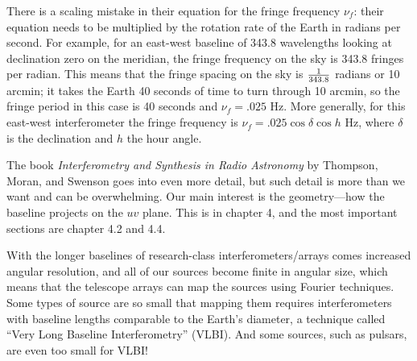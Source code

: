 \documentclass[11pt,preprint]{aastex}
\begin{document}
	There is a scaling mistake in their equation for the fringe
frequency $\nu_f$: their equation needs to be multiplied by the rotation
rate of the Earth in radians per second.  For example, for an east-west
baseline of 343.8 wavelengths looking at declination zero on the
meridian, the fringe frequency on the sky is 343.8 fringes per radian. 
This means that the fringe spacing on the sky is ${1 \over 343.8}$
radians or 10 arcmin; it takes the Earth 40 seconds of time to turn
through 10 arcmin, so the fringe period in this case is 40 seconds and
$\nu_f = .025$ Hz.  More generally, for this east-west interferometer
the fringe frequency is $\nu_f = .025 \cos \delta \cos h$ Hz, where
$\delta$ is the declination and $h$ the hour angle. 

The book {\it Interferometry and Synthesis in
Radio Astronomy} by Thompson, Moran, and Swenson goes into even more detail,
but such detail is
more than we want and can be overwhelming.  Our main interest is the
geometry---how the baseline projects on the $uv$ plane.  This is in
chapter 4, and the most important sections are chapter 4.2 and
4.4. 

With the longer baselines of research-class interferometers/arrays comes
increased angular resolution, and all of our sources become finite in
angular size, which means that the telescope arrays can map the sources
using Fourier techniques. Some types of source are so small that mapping
them requires interferometers with baseline lengths comparable to the
Earth's diameter, a technique called ``Very Long Baseline
Interferometry'' (VLBI). And some sources, such as pulsars, are even too
small for VLBI!
\end{document}
